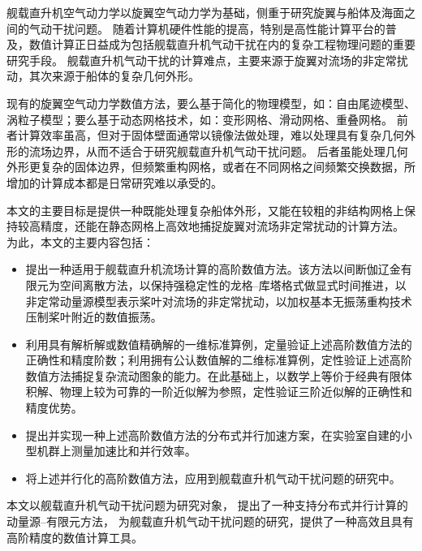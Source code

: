 
{}
\begin{cabstract}
舰载直升机空气动力学以旋翼空气动力学为基础，侧重于研究旋翼与船体及海面之间的气动干扰问题。
随着计算机硬件性能的提高，特别是高性能计算平台的普及，数值计算正日益成为包括舰载直升机气动干扰在内的复杂工程物理问题的重要研究手段。
舰载直升机气动干扰的计算难点，主要来源于旋翼对流场的非定常扰动，其次来源于船体的复杂几何外形。

现有的旋翼空气动力学数值方法，要么基于简化的物理模型，如：自由尾迹模型、涡粒子模型；要么基于动态网格技术，如：变形网格、滑动网格、重叠网格。
前者计算效率虽高，但对于固体壁面通常以镜像法做处理，难以处理具有复杂几何外形的流场边界，从而不适合于研究舰载直升机气动干扰问题。
后者虽能处理几何外形更复杂的固体边界，但频繁重构网格，或者在不同网格之间频繁交换数据，所增加的计算成本都是日常研究难以承受的。

本文的主要目标是提供一种既能处理复杂船体外形，又能在较粗的非结构网格上保持较高精度，还能在静态网格上高效地捕捉旋翼对流场非定常扰动的计算方法。
为此，本文的主要内容包括：
\begin{itemize}[wide]
\item 提出一种适用于舰载直升机流场计算的高阶数值方法。该方法以间断伽辽金有限元为空间离散方法，以保持强稳定性的龙格--库塔格式做显式时间推进，以非定常动量源模型表示桨叶对流场的非定常扰动，以加权基本无振荡重构技术压制桨叶附近的数值振荡。
\item 利用具有解析解或数值精确解的一维标准算例，定量验证上述高阶数值方法的正确性和精度阶数；利用拥有公认数值解的二维标准算例，定性验证上述高阶数值方法捕捉复杂流动图象的能力。在此基础上，以数学上等价于经典有限体积解、物理上较为可靠的一阶近似解为参照，定性验证三阶近似解的正确性和精度优势。
\item 提出并实现一种上述高阶数值方法的分布式并行加速方案，在实验室自建的小型机群上测量加速比和并行效率。
\item 将上述并行化的高阶数值方法，应用到舰载直升机气动干扰问题的研究中。
\end{itemize}

本文以舰载直升机气动干扰问题为研究对象，
提出了一种支持分布式并行计算的动量源--有限元方法，
为舰载直升机气动干扰问题的研究，提供了一种高效且具有高阶精度的数值计算工具。
\end{cabstract}

